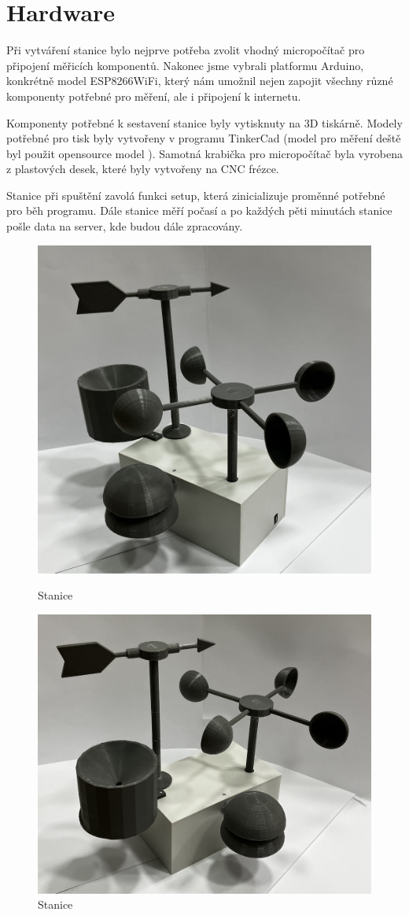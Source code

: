 \section{Hardware}
Při vytváření stanice bylo nejprve potřeba zvolit vhodný micropočítač pro připojení měřicích komponentů. Nakonec jsme vybrali platformu Arduino,
konkrétně model ESP8266WiFi, který nám umožnil nejen zapojit všechny různé komponenty potřebné pro měření, ale i připojení k internetu.

Komponenty potřebné k sestavení stanice byly vytisknuty na 3D tiskárně. Modely potřebné pro tisk byly vytvořeny v programu TinkerCad
(model pro měření deště byl použit opensource model \cite{mereni_deste}). Samotná krabička pro micropočítač byla vyrobena z plastových desek,
které byly vytvořeny na CNC frézce.  

Stanice při spuštění zavolá funkci setup, která zinicializuje proměnné potřebné pro běh programu. 
Dále stanice měří počasí a po každých pěti minutách stanice pošle data na server, kde budou dále zpracovány.

\begin{figure}[!htb]
   \begin{minipage}{0.48\textwidth}
     \centering
     \includegraphics[width=.7\linewidth]{images/stanice0.jpg}
     \caption{Stanice}
   \end{minipage}\hfill
   \begin{minipage}{0.5\textwidth}
     \centering
     \includegraphics[width=.7\linewidth]{images/stanice1.jpg}
     \caption{Stanice}
   \end{minipage}
\end{figure}

